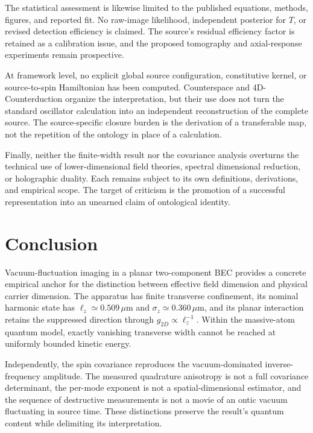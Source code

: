\documentclass[11pt,a4paper]{article}
\theoremstyle{definition}
\theoremstyle{remark}
\newcommand{\lop}{\ell_z}
\begin{document}
The statistical assessment is likewise limited to the published equations, methods, figures, and reported fit. No raw-image likelihood, independent posterior for $T$, or revised detection efficiency is claimed. The source's residual efficiency factor is retained as a calibration issue, and the proposed tomography and axial-response experiments remain prospective.\cite{zhang2026}

At framework level, no explicit global source configuration, constitutive kernel, or source-to-spin Hamiltonian has been computed. Counterspace and 4D-Counterduction organize the interpretation, but their use does not turn the standard oscillator calculation into an independent reconstruction of the complete source. The source-specific closure burden is the derivation of a transferable map, not the repetition of the ontology in place of a calculation.\cite{foundation,planck}

Finally, neither the finite-width result nor the covariance analysis overturns the technical use of lower-dimensional field theories, spectral dimensional reduction, or holographic duality. Each remains subject to its own definitions, derivations, and empirical scope. The target of criticism is the promotion of a successful representation into an unearned claim of ontological identity.\cite{carlip,bousso,foundation}

\section{Conclusion}
\label{sec:conclusion}
Vacuum-fluctuation imaging in a planar two-component BEC provides a concrete empirical anchor for the distinction between effective field dimension and physical carrier dimension. The apparatus has finite transverse confinement, its nominal harmonic state has $\lop\simeq0.509\,\mu\mathrm m$ and $\sigma_z\simeq0.360\,\mu\mathrm m$, and its planar interaction retains the suppressed direction through $g_{2D}\propto\lop^{-1}$. Within the massive-atom quantum model, exactly vanishing transverse width cannot be reached at uniformly bounded kinetic energy.\cite{zhang2026}

Independently, the spin covariance reproduces the vacuum-dominated inverse-frequency amplitude. The measured quadrature anisotropy is not a full covariance determinant, the per-mode exponent is not a spatial-dimensional estimator, and the sequence of destructive measurements is not a movie of an ontic vacuum fluctuating in source time. These distinctions preserve the result's quantum content while delimiting its interpretation.\cite{zhang2026}
\end{document}
